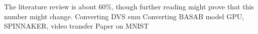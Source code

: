 The literature review is about 60\%, though further reading might prove that 
this number might change. 
Converting DVS emu
Converting BASAB model GPU, SPINNAKER, video transfer
Paper on MNIST

%
%
%

